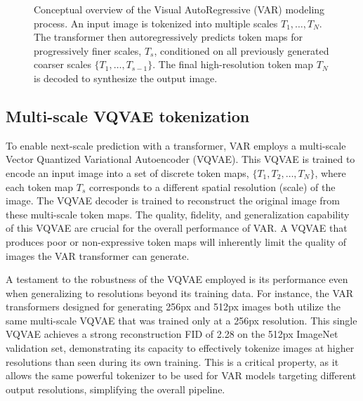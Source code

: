 \documentclass{article}
\begin{document}
\begin{figure}[htbp] %
\centering
\fbox{\rule{0.9\textwidth}{8cm}} %
\caption{Conceptual overview of the Visual AutoRegressive (VAR) modeling process. An input image is tokenized into multiple scales $T_1, \ldots, T_N$. The transformer then autoregressively predicts token maps for progressively finer scales, $T_s$, conditioned on all previously generated coarser scales $\{T_1, \ldots, T_{s-1}\}$. The final high-resolution token map $T_N$ is decoded to synthesize the output image.}
\label{fig:var_process}
\end{figure}

\subsection{Multi-scale VQVAE tokenization}
\label{ssec:vqvae_tokenization}

To enable next-scale prediction with a transformer, VAR employs a multi-scale Vector Quantized Variational Autoencoder (VQVAE). This VQVAE is trained to encode an input image into a set of discrete token maps, $\{T_1, T_2, \ldots, T_N\}$, where each token map $T_s$ corresponds to a different spatial resolution (scale) of the image. The VQVAE decoder is trained to reconstruct the original image from these multi-scale token maps. The quality, fidelity, and generalization capability of this VQVAE are crucial for the overall performance of VAR. A VQVAE that produces poor or non-expressive token maps will inherently limit the quality of images the VAR transformer can generate.

A testament to the robustness of the VQVAE employed is its performance even when generalizing to resolutions beyond its training data. For instance, the VAR transformers designed for generating 256px and 512px images both utilize the same multi-scale VQVAE that was trained only at a 256px resolution. This single VQVAE achieves a strong reconstruction FID of 2.28 on the 512px ImageNet validation set, demonstrating its capacity to effectively tokenize images at higher resolutions than seen during its own training. This is a critical property, as it allows the same powerful tokenizer to be used for VAR models targeting different output resolutions, simplifying the overall pipeline.
\end{document}
